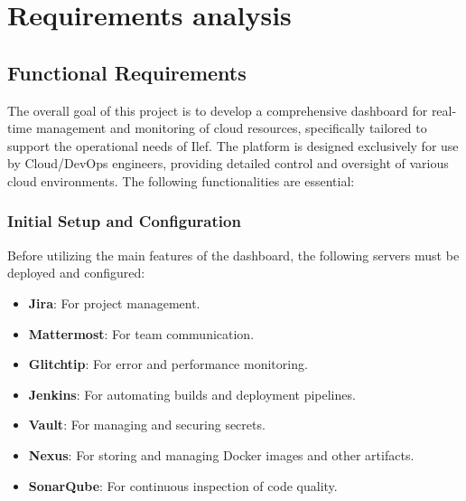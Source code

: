 \section{Requirements analysis}

\subsection{Functional Requirements}
The overall goal of this project is to develop a comprehensive dashboard for real-time management and monitoring of cloud resources, specifically tailored to support the operational needs of Ilef. The platform is designed exclusively for use by Cloud/DevOps engineers, providing detailed control and oversight of various cloud environments. The following functionalities are essential:

\subsubsection{Initial Setup and Configuration}
Before utilizing the main features of the dashboard, the following servers must be deployed and configured:
\begin{itemize}
    \item \textbf{Jira}: For project management.
    \item \textbf{Mattermost}: For team communication.
    \item \textbf{Glitchtip}: For error and performance monitoring.
    \item \textbf{Jenkins}: For automating builds and deployment pipelines.
    \item \textbf{Vault}: For managing and securing secrets.
    \item \textbf{Nexus}: For storing and managing Docker images and other artifacts.
    \item \textbf{SonarQube}: For continuous inspection of code quality.
\end{itemize}

